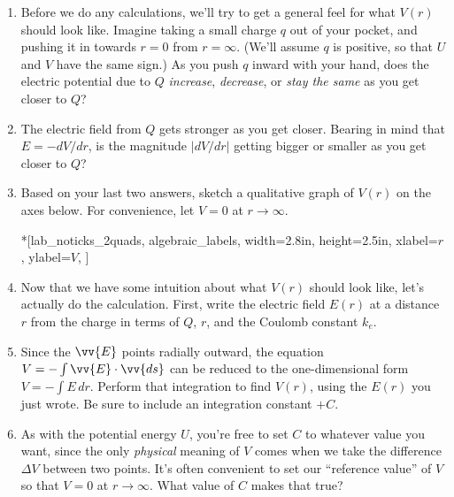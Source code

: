 \begin{enumerate}[labparts]

\item Before we do any calculations, we'll try to get a general feel for what $V(r)$ should look like.  Imagine taking a small charge $q$ out of your pocket, and pushing it in towards $r=0$ from $r=\infty$.  (We'll assume $q$ is positive, so that $U$ and $V$ have the same sign.)  As you push $q$ inward with your hand, does the electric potential due to $Q$ \textit{increase}, \textit{decrease}, or \textit{stay the same} as you get closer to $Q$?
\answerspace{0.4in}

\item The electric field from $Q$ gets stronger as you get closer.  Bearing in mind that $E = -dV/dr$, is the magnitude $\left | {dV}/{dr}\right |$ getting bigger or smaller as you get closer to $Q$?
\answerspace{0.4in}

\item Based on your last two answers, sketch a qualitative graph of $V(r)$ on the axes below.  For convenience, let $V=0$ at $r \rightarrow \infty$. \label{part_potential_intro_sketch_of_Vr}
\begin{lab_axis}*[lab_noticks_2quads,
	algebraic_labels,
	width={2.8in}, height={2.5in},
	xlabel={$r$},
	ylabel={$V$},
	]
\end{lab_axis}

\pagebreak[2]
\item Now that we have some intuition about what $V(r)$ should look like, let's actually do the calculation.  First, write the electric field $E(r)$ at a distance $r$ from the charge in terms of $Q$, $r$, and the Coulomb constant $k_e$.
\answerspace{0.5in}

\item Since the $\vv{E}$ points radially outward, the equation $V=-\int{\vv{E} \cdot \vv{ds}}$ can be reduced to 
the one-dimensional form $V=-\int{E \, dr}$.  Perform that integration to find $V(r)$, using the $E(r)$ you just wrote. Be sure to include an integration constant $+C$.
\answerspace{1.2in}

\item As with the potential energy $U$, you're free to set $C$ to whatever value you want, since the only \textit{physical} meaning of $V$ comes when we take the difference $\Delta V$ between two points.  It's often convenient to set our ``reference value'' of $V$ so that $V=0$ at $r \rightarrow \infty$.  What value of $C$ makes that true?
\answerspace{0.5in}


\end{enumerate}

